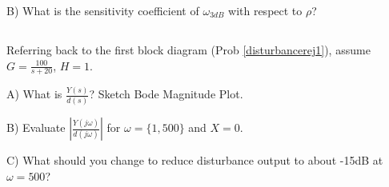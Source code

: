 \documentclass{article}	%
\begin{document}
B) What is the sensitivity coefficient  of $\omega_{3dB}$ with respect to $\rho$?

%


\subsection{}
 Referring back to the first block diagram (Prob \ref{disturbancerej1}), assume $G=\frac{100}{s+20}$, $H=1$.

A) What is $\frac{Y(s)}{d(s)}$?   Sketch Bode Magnitude Plot.

%

B) Evaluate $|\frac{Y(j\omega)}{d(j\omega)}|$ for $\omega = \{1, 500\}$ and $X=0$.

%
%

C) What should you change to reduce disturbance output to about -15dB at $\omega=500$?

%
%
%
%    
% 
%
%
\end{document}
